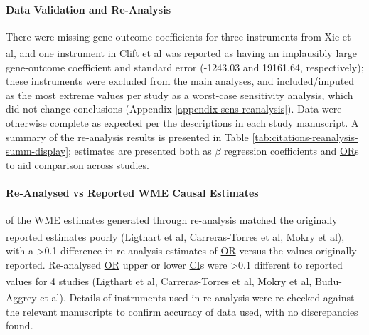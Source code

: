 \documentclass[
]{article}
\begin{document}
\paragraph{Data Validation and Re-Analysis}\label{data-validation-and-re-analysis}

\leavevmode\newline There were missing gene-outcome coefficients for three instruments from Xie et al\textsuperscript{}, and one instrument in Clift et al\textsuperscript{} was reported as having an implausibly large gene-outcome coefficient and standard error (-1243.03 and 19161.64, respectively); these instruments were excluded from the main analyses, and included/imputed as the most extreme values per study as a worst-case sensitivity analysis, which did not change conclusions (Appendix \ref{appendix-sens-reanalysis}). Data were otherwise complete as expected per the descriptions in each study manuscript. A summary of the re-analysis results is presented in Table \ref{tab:citations-reanalysis-summ-display}; estimates are presented both as \(\beta\) regression coefficients and \hyperref[acronyms_OR]{OR}s to aid comparison across studies.

\paragraph{Re-Analysed vs Reported WME Causal Estimates}\label{re-analysed-vs-reported-wme-causal-estimates}

\leavevmode{} of the \hyperref[acronyms_WME]{WME} estimates generated through re-analysis matched the originally reported estimates poorly (Ligthart et al\textsuperscript{}, Carreras-Torres et al\textsuperscript{}, Mokry et al\textsuperscript{}), with a \textgreater0.1 difference in re-analysis estimates of \hyperref[acronyms_OR]{OR} versus the values originally reported. Re-analysed \hyperref[acronyms_OR]{OR} upper or lower \hyperref[acronyms_CI]{CI}s were \textgreater0.1 different to reported values for 4 studies (Ligthart et al\textsuperscript{}, Carreras-Torres et al\textsuperscript{}, Mokry et al\textsuperscript{}, Budu-Aggrey et al\textsuperscript{}). Details of instruments used in re-analysis were re-checked against the relevant manuscripts to confirm accuracy of data used, with no discrepancies found.
\end{document}
